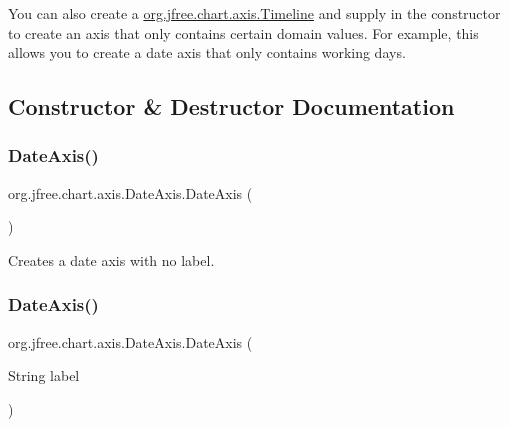 You can also create a \mbox{\hyperlink{interfaceorg_1_1jfree_1_1chart_1_1axis_1_1_timeline}{org.\+jfree.\+chart.\+axis.\+Timeline}} and supply in the constructor to create an axis that only contains certain domain values. For example, this allows you to create a date axis that only contains working days. 

\subsection{Constructor \& Destructor Documentation}
\mbox{\label{classorg_1_1jfree_1_1chart_1_1axis_1_1_date_axis_a352eb2aff66685f3a68039ed896f20cb}} 
\subsubsection{\texorpdfstring{Date\+Axis()}{DateAxis()}\hspace{0.1cm}{\footnotesize\ttfamily [1/4]}}
{\footnotesize\ttfamily org.\+jfree.\+chart.\+axis.\+Date\+Axis.\+Date\+Axis (\begin{DoxyParamCaption}{ }\end{DoxyParamCaption})}

Creates a date axis with no label. \mbox{\label{classorg_1_1jfree_1_1chart_1_1axis_1_1_date_axis_a612cb63cb23fd18583e242f7268819b5}} 
\subsubsection{\texorpdfstring{Date\+Axis()}{DateAxis()}\hspace{0.1cm}{\footnotesize\ttfamily [2/4]}}
{\footnotesize\ttfamily org.\+jfree.\+chart.\+axis.\+Date\+Axis.\+Date\+Axis (\begin{DoxyParamCaption}\item[{String}]{label }\end{DoxyParamCaption})}

